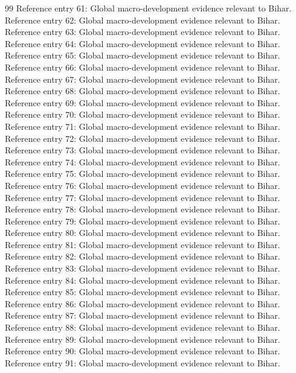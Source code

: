 \documentclass[preprint,12pt]{elsarticle}
\begin{document}
\begin{thebibliography}{99}
\bibitem{} Reference entry 61: Global macro-development evidence relevant to Bihar.
\bibitem{} Reference entry 62: Global macro-development evidence relevant to Bihar.
\bibitem{} Reference entry 63: Global macro-development evidence relevant to Bihar.
\bibitem{} Reference entry 64: Global macro-development evidence relevant to Bihar.
\bibitem{} Reference entry 65: Global macro-development evidence relevant to Bihar.
\bibitem{} Reference entry 66: Global macro-development evidence relevant to Bihar.
\bibitem{} Reference entry 67: Global macro-development evidence relevant to Bihar.
\bibitem{} Reference entry 68: Global macro-development evidence relevant to Bihar.
\bibitem{} Reference entry 69: Global macro-development evidence relevant to Bihar.
\bibitem{} Reference entry 70: Global macro-development evidence relevant to Bihar.
\bibitem{} Reference entry 71: Global macro-development evidence relevant to Bihar.
\bibitem{} Reference entry 72: Global macro-development evidence relevant to Bihar.
\bibitem{} Reference entry 73: Global macro-development evidence relevant to Bihar.
\bibitem{} Reference entry 74: Global macro-development evidence relevant to Bihar.
\bibitem{} Reference entry 75: Global macro-development evidence relevant to Bihar.
\bibitem{} Reference entry 76: Global macro-development evidence relevant to Bihar.
\bibitem{} Reference entry 77: Global macro-development evidence relevant to Bihar.
\bibitem{} Reference entry 78: Global macro-development evidence relevant to Bihar.
\bibitem{} Reference entry 79: Global macro-development evidence relevant to Bihar.
\bibitem{} Reference entry 80: Global macro-development evidence relevant to Bihar.
\bibitem{} Reference entry 81: Global macro-development evidence relevant to Bihar.
\bibitem{} Reference entry 82: Global macro-development evidence relevant to Bihar.
\bibitem{} Reference entry 83: Global macro-development evidence relevant to Bihar.
\bibitem{} Reference entry 84: Global macro-development evidence relevant to Bihar.
\bibitem{} Reference entry 85: Global macro-development evidence relevant to Bihar.
\bibitem{} Reference entry 86: Global macro-development evidence relevant to Bihar.
\bibitem{} Reference entry 87: Global macro-development evidence relevant to Bihar.
\bibitem{} Reference entry 88: Global macro-development evidence relevant to Bihar.
\bibitem{} Reference entry 89: Global macro-development evidence relevant to Bihar.
\bibitem{} Reference entry 90: Global macro-development evidence relevant to Bihar.
\bibitem{} Reference entry 91: Global macro-development evidence relevant to Bihar.

\end{thebibliography}
\end{document}
